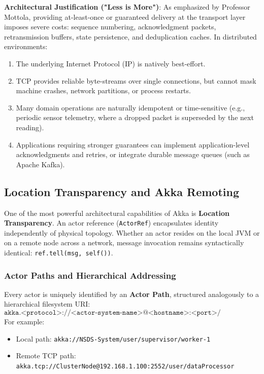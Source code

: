 \textbf{Architectural Justification ("Less is More")}:
As emphasized by Professor Mottola, providing at-least-once or guaranteed delivery at the transport layer imposes severe costs: sequence numbering, acknowledgment packets, retransmission buffers, state persistence, and deduplication caches. In distributed environments:
\begin{enumerate}
    \item The underlying Internet Protocol (IP) is natively best-effort.
    \item TCP provides reliable byte-streams over single connections, but cannot mask machine crashes, network partitions, or process restarts.
    \item Many domain operations are naturally idempotent or time-sensitive (e.g., periodic sensor telemetry, where a dropped packet is superseded by the next reading).
    \item Applications requiring stronger guarantees can implement application-level acknowledgments and retries, or integrate durable message queues (such as Apache Kafka).
\end{enumerate}

\subsection{Location Transparency and Akka Remoting}
One of the most powerful architectural capabilities of Akka is \textbf{Location Transparency}. An actor reference (\texttt{ActorRef}) encapsulates identity independently of physical topology. Whether an actor resides on the local JVM or on a remote node across a network, message invocation remains syntactically identical: \texttt{ref.tell(msg, self())}.

\subsubsection{Actor Paths and Hierarchical Addressing}
Every actor is uniquely identified by an \textbf{Actor Path}, structured analogously to a hierarchical filesystem URI:
\begin{equation}
\texttt{akka.<protocol>://<actor-system-name>@<hostname>:<port>/user/<actor-hierarchy-path>}
\end{equation}
For example:
\begin{itemize}
    \item Local path: \texttt{akka://NSDS-System/user/supervisor/worker-1}
    \item Remote TCP path: \texttt{akka.tcp://ClusterNode@192.168.1.100:2552/user/dataProcessor}
\end{itemize}

